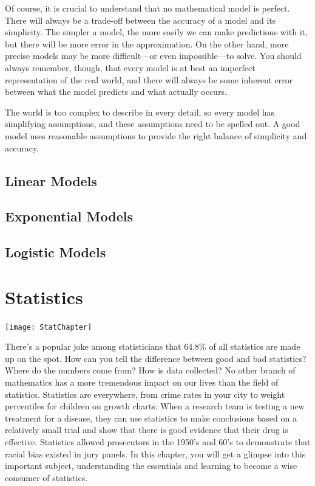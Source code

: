\documentclass[9pt,letter,twoside,openright]{memoir}
\begin{document}
Of course, it is crucial to understand that no mathematical model is perfect.  There will always be a trade-off between the accuracy of a model and its simplicity.  The simpler a model, the more easily we can make predictions with it, but there will be more error in the approximation.  On the other hand, more precise models may be more difficult---or even impossible---to solve.  You should always remember, though, that every model is at best an imperfect representation of the real world, and there will always be some inherent error between what the model predicts and what actually occurs.

The world is too complex to describe in every detail, so every model has simplifying assumptions, and these assumptions need to be spelled out.  A good model uses reasonable assumptions to provide the right balance of simplicity and accuracy.
\vfill
\pagebreak

\section{Linear Models}


\section{Exponential Models}


\section{Logistic Models}


\chapter{Statistics}
\begin{center}\texttt{[image: StatChapter]}\end{center}

There's a popular joke among statisticians that 64.8\% of all statistics are made up on the spot. How can you tell the difference between good and bad statistics? 
Where do the numbers come from? How is data collected? No other branch of mathematics has a more tremendous impact on our lives than the field of statistics. 
Statistics are everywhere, from crime rates in your city to weight percentiles for children on growth charts. When a research team is testing a new treatment for a disease, they can use statistics to make conclusions based on a relatively small trial and show that there is good evidence that their drug is effective. Statistics allowed prosecutors in the 1950's 
and 60's to demonstrate that racial bias existed in jury panels. In this chapter, you will get a glimpse into this important subject, understanding the essentials and learning to become a wise consumer of statistics. 
\vfill
\pagebreak
\end{document}
